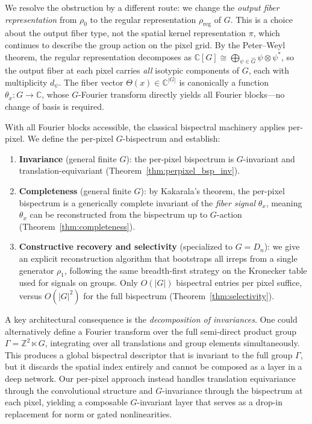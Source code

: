 \documentclass{article}
\theoremstyle{definition}
\theoremstyle{remark}
\newcommand{\C}{\mathbb{C}}
\newcommand{\Z}{\mathbb{Z}}
\newcommand{\Ghat}{\widehat{G}}
\begin{document}
We resolve the obstruction by a different route: we change the \textit{output fiber representation} from $\rho_0$ to the regular representation $\rho_{\mathrm{reg}}$ of $G$. This is a choice about the output fiber type, not the spatial kernel representation $\pi$, which continues to describe the group action on the pixel grid. By the Peter--Weyl theorem, the regular representation decomposes as $\C[G] \cong \bigoplus_{\psi \in \Ghat} \psi \otimes \psi^*$, so the output fiber at each pixel carries \textit{all} isotypic components of $G$, each with multiplicity $d_\psi$. The fiber vector $\Theta(x) \in \C^{|G|}$ is canonically a function $\theta_x : G \to \C$, whose $G$-Fourier transform directly yields all Fourier blocks---no change of basis is required.

With all Fourier blocks accessible, the classical bispectral machinery applies per-pixel. We define the per-pixel $G$-bispectrum and establish:
\begin{enumerate}
    \item \textbf{Invariance} (general finite $G$): the per-pixel bispectrum is $G$-invariant and translation-equivariant (Theorem~\ref{thm:perpixel_bsp_inv}).
    \item \textbf{Completeness} (general finite $G$): by Kakarala's theorem, the per-pixel bispectrum is a generically complete invariant of the \textit{fiber signal} $\theta_x$, meaning $\theta_x$ can be reconstructed from the bispectrum up to $G$-action (Theorem~\ref{thm:completeness}).
    \item \textbf{Constructive recovery and selectivity} (specialized to $G = D_n$): we give an explicit reconstruction algorithm that bootstraps all irreps from a single generator $\rho_1$, following the same breadth-first strategy on the Kronecker table used for signals on groups. Only $O(|G|)$ bispectral entries per pixel suffice, versus $O(|G|^2)$ for the full bispectrum (Theorem~\ref{thm:selectivity}).
\end{enumerate}

A key architectural consequence is the \textit{decomposition of invariances}. One could alternatively define a Fourier transform over the full semi-direct product group $\Gamma = \Z^2 \ltimes G$, integrating over all translations and group elements simultaneously. This produces a global bispectral descriptor that is invariant to the full group $\Gamma$, but it discards the spatial index entirely and cannot be composed as a layer in a deep network. Our per-pixel approach instead handles translation equivariance through the convolutional structure and $G$-invariance through the bispectrum at each pixel, yielding a composable $G$-invariant layer that serves as a drop-in replacement for norm or gated nonlinearities.
\end{document}
